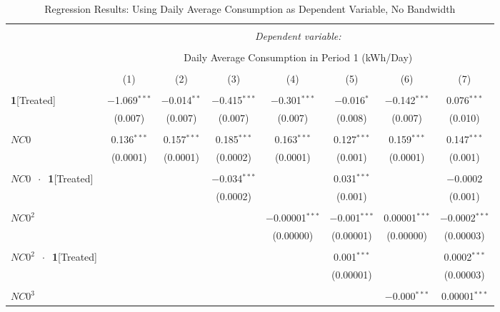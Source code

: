\begin{table}[!htbp]
\centering 
\caption{Regression Results: Using Daily Average Consumption as Dependent Variable, No Bandwidth} 
\label{Table:Regression-Results_Daily-Average_NA-BW} 
\small 
\begin{adjustbox}{scale = 0.65}
\begin{tabular}{@{\extracolsep{50pt}}lccccccc} 
\\[-1.8ex]\hline 
\hline \\[-1.8ex] 
 & \multicolumn{7}{c}{\textit{Dependent variable:}} \\ 
\cline{2-8} 
\\[-1.8ex] & \multicolumn{7}{c}{Daily Average Consumption in Period 1 (kWh/Day)} \\ 
\\[-1.8ex] & (1) & (2) & (3) & (4) & (5) & (6) & (7)\\ 
\hline \\[-1.8ex] 
 \textbf{1}[Treated] & $-$1.069$^{***}$ & $-$0.014$^{**}$ & $-$0.415$^{***}$ & $-$0.301$^{***}$ & $-$0.016$^{*}$ & $-$0.142$^{***}$ & 0.076$^{***}$ \\ 
  & (0.007) & (0.007) & (0.007) & (0.007) & (0.008) & (0.007) & (0.010) \\ 
  & & & & & & & \\ 
 $NC0$ & 0.136$^{***}$ & 0.157$^{***}$ & 0.185$^{***}$ & 0.163$^{***}$ & 0.127$^{***}$ & 0.159$^{***}$ & 0.147$^{***}$ \\ 
  & (0.0001) & (0.0001) & (0.0002) & (0.0001) & (0.001) & (0.0001) & (0.001) \\ 
  & & & & & & & \\ 
 $NC0$ $\ \cdot \ $ \textbf{1}[Treated] &  &  & $-$0.034$^{***}$ &  & 0.031$^{***}$ &  & $-$0.0002 \\ 
  &  &  & (0.0002) &  & (0.001) &  & (0.001) \\ 
  & & & & & & & \\ 
 $NC0^{2}$ &  &  &  & $-$0.00001$^{***}$ & $-$0.001$^{***}$ & 0.00001$^{***}$ & $-$0.0002$^{***}$ \\ 
  &  &  &  & (0.00000) & (0.00001) & (0.00000) & (0.00003) \\ 
  & & & & & & & \\ 
 $NC0^{2}$ $\ \cdot \ $ \textbf{1}[Treated] &  &  &  &  & 0.001$^{***}$ &  & 0.0002$^{***}$ \\ 
  &  &  &  &  & (0.00001) &  & (0.00003) \\ 
  & & & & & & & \\ 
 $NC0^{3}$ &  &  &  &  &  & $-$0.000$^{***}$ & 0.00001$^{***}$ \\ 

\end{tabular}
\end{adjustbox}
\end{table}
